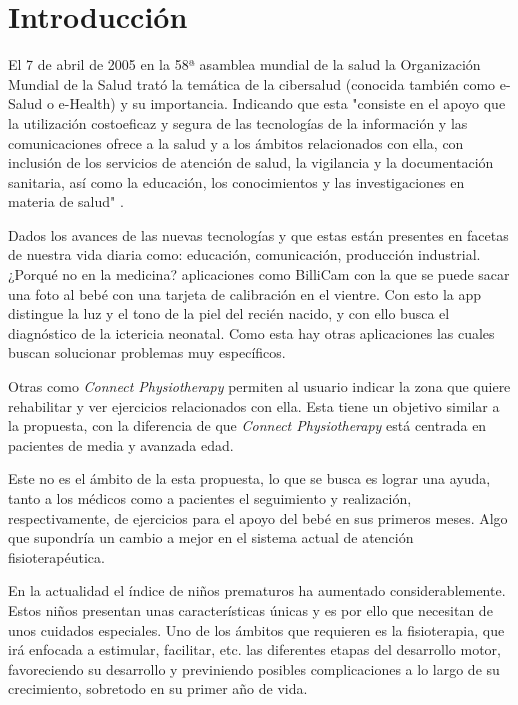 \section{Introducción}
El 7 de abril de 2005 en la 58ª asamblea mundial de la salud la Organización Mundial
de la Salud \cite{OMS} trató la temática de la cibersalud (conocida también como e-Salud
o e-Health) y su importancia. Indicando que esta "consiste en el apoyo que
la utilización costoeficaz y segura de las tecnologías de la información y las comunicaciones
ofrece a la salud y a los ámbitos relacionados con ella, con inclusión de los servicios de
atención de salud, la vigilancia y la documentación sanitaria, así como la educación, los
conocimientos y las investigaciones en materia de salud" \cite{58-asamblea}.

Dados los avances de las nuevas tecnologías y que estas están presentes en facetas de
nuestra vida diaria como: educación, comunicación, producción industrial. ¿Porqué no
en la medicina? aplicaciones como
BilliCam \cite{BilliCam} con la que se puede sacar una foto al bebé con una tarjeta de
calibración en el vientre. Con esto la app distingue la luz y el tono de la piel del recién
nacido, y con ello busca el diagnóstico de la ictericia neonatal. Como esta hay otras
aplicaciones las cuales buscan solucionar problemas muy específicos.

Otras como \textit{Connect Physiotherapy} \cite{Connect-Physiotherapy} permiten al usuario
indicar la zona que quiere rehabilitar y ver ejercicios relacionados con ella. Esta tiene
un objetivo similar a la propuesta, con la diferencia de que \textit{Connect Physiotherapy}
está centrada en pacientes de media y avanzada edad.

Este no es el ámbito de la esta propuesta, lo que se busca es lograr una ayuda, tanto a
los médicos como a pacientes el seguimiento y realización, respectivamente, de ejercicios
para el apoyo del bebé en sus primeros meses. Algo que supondría un cambio a mejor en el
sistema actual de atención fisioterapéutica.

\bigskip
En la actualidad el índice de niños prematuros ha aumentado considerablemente. Estos niños presentan
unas características únicas y es por ello que necesitan de unos cuidados especiales. Uno de los
ámbitos que requieren es la fisioterapia, que irá enfocada a estimular, facilitar, etc. las
diferentes etapas del desarrollo motor, favoreciendo su desarrollo y previniendo posibles
complicaciones a lo largo de su crecimiento, sobretodo en su primer año de vida.

